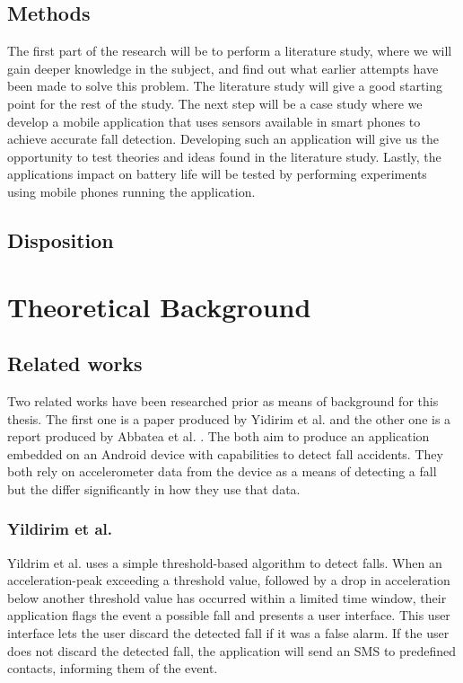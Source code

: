 \documentclass[12pt, a4paper, onecolumn]{article}
\begin{document}
		\subsection{Methods}
		
		The first part of the research will be to perform a literature study, where we will gain deeper knowledge in the subject, and find out what earlier attempts have been made to solve this problem. The literature study will give a good starting point for the rest of the study. The next step will be a case study where we develop a mobile application that uses sensors available in smart phones to achieve accurate fall detection. Developing such an application will give us the opportunity to test theories and ideas found in the literature study. Lastly, the applications impact on battery life will be tested by performing experiments using mobile phones running the application.
		
		\subsection{Disposition}
		
	\newpage
	
	\section{Theoretical Background}
	
	\subsection{Related works} Two related works have been researched prior as means of background for this thesis. The first one is a paper produced by Yidirim et al. \cite{int_journ} and the other one is a report produced by Abbatea et al. \cite{piza_uni}. The both aim to produce an application embedded on an Android device with capabilities to detect fall accidents. They both rely on accelerometer data from the device as a means of detecting a fall but the differ significantly in how they use that data. 
	
	\subsubsection{Yildirim et al.}
	Yildrim et al. \cite{int_journ} uses a simple threshold-based algorithm to detect falls. When an acceleration-peak exceeding a threshold value, followed by a drop in acceleration below another threshold value has occurred within a limited time window, their application flags the event a possible fall and presents a user interface. This user interface lets the user discard the detected fall if it was a false alarm. If the user does not discard the detected fall, the application will send an SMS to predefined contacts, informing them of the event. 
	
\end{document}
